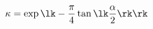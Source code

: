 \begin{equation}
\kappa=\exp\lk-\frac{\pi}{4}\tan\lk\frac{\alpha}{2}\rk\rk
\label{selbstfortenergie}
\end{equation}

